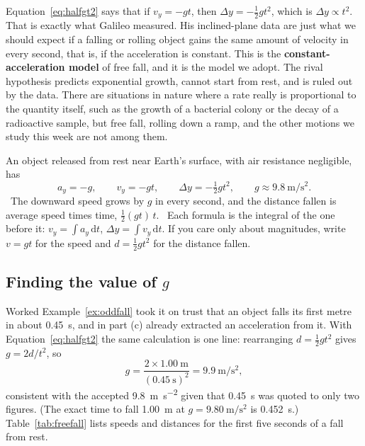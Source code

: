 \documentclass[11pt,twoside,openany]{book}
\newcommand{\dd}{\mathrm{d}}
\newcommand{\viewtag}[3]{\fcolorbox{#2}{#3}{\footnotesize\textbf{\textcolor{#2}{#1}}}}
\newcommand{\elemtag}{\viewtag{Elementary}{elemcol}{elempale}}
\newcommand{\calctag}{\viewtag{Calculus}{calccol}{calcpale}}
\begin{document}
Equation~\eqref{eq:halfgt2} says that if $v_y = -gt$, then $\Delta y = -\tfrac12 g t^2$, which is $\Delta y \propto t^2$. That is exactly what Galileo measured. His inclined-plane data are just what we should expect if a falling or rolling object gains the same amount of velocity in every second, that is, if the acceleration is constant. This is the \textbf{constant-acceleration model} of free fall, and it is the model we adopt. The rival hypothesis predicts exponential growth, cannot start from rest, and is ruled out by the data. There are situations in nature where a rate really is proportional to the quantity itself, such as the growth of a bacterial colony or the decay of a radioactive sample, but free fall, rolling down a ramp, and the other motions we study this week are not among them.

\begin{keyidea}
An object released from rest near Earth's surface, with air resistance negligible, has
\[
a_y = -g, \qquad v_y = -g t, \qquad \Delta y = -\tfrac12 g t^2, \qquad g \approx \SI{9.8}{\metre\per\second\squared}.
\]
\elemtag\ The downward speed grows by $g$ in every second, and the distance fallen is average speed times time, $\tfrac12(gt)\,t$. \calctag\ Each formula is the integral of the one before it: $v_y = \int a_y\,\dd t$, $\Delta y = \int v_y\,\dd t$. If you care only about magnitudes, write $v = gt$ for the speed and $d = \tfrac12 g t^2$ for the distance fallen.
\end{keyidea}

\subsection{Finding the value of \texorpdfstring{$g$}{g}}

Worked Example~\ref{ex:oddfall} took it on trust that an object falls its first metre in about \SI{0.45}{\second}, and in part (c) already extracted an acceleration from it. With Equation~\eqref{eq:halfgt2} the same calculation is one line: rearranging $d = \tfrac12 g t^2$ gives $g = 2d/t^2$, so
\[
g = \frac{2 \times \SI{1.00}{\metre}}{(\SI{0.45}{\second})^2} = \SI{9.9}{\metre\per\second\squared},
\]
consistent with the accepted \SI{9.8}{\metre\per\second\squared} given that \SI{0.45}{\second} was quoted to only two figures. (The exact time to fall \SI{1.00}{\metre} at $g = \SI{9.80}{\metre\per\second\squared}$ is \SI{0.452}{\second}.) Table~\ref{tab:freefall} lists speeds and distances for the first five seconds of a fall from rest.
\end{document}
